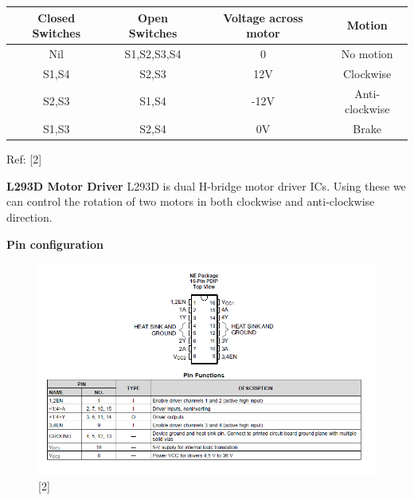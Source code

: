 \documentclass[11pt,a4paper]{article}
\begin{document}
    \begin{tabular}{|c|c|c|c|}
    	\hline
	    Closed Switches & Open Switches & Voltage across motor & Motion\\
	    \hline
		Nil	& S1,S2,S3,S4	& 0 & No motion\\
		\hline
	    S1,S4 &	S2,S3 &	12V & Clockwise \\
	    \hline
	    S2,S3 & S1,S4 & -12V & Anti-clockwise \\
	    \hline
	    S1,S3 & S2,S4 & 0V & Brake\\
	    \hline
    \end{tabular}
    \centering
    Ref: [2]
    
    \newpage
    \flushleft
    \textbf{L293D Motor Driver}
    \vspace{0.3cm}
    \newline
    L293D is dual H-bridge motor driver ICs. Using these we can control the rotation of two motors in both clockwise and anti-clockwise direction.
    
    \vspace{0.3cm}
    \textbf{Pin configuration}
    \begin{figure}[h!]
    	\includegraphics[scale=0.7]{l293d_with_pinfun.png}
    	\centering
    	\caption{[2]}
    \end{figure}
    
\end{document}
